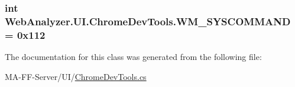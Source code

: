 \subsubsection[{W\+M\+\_\+\+S\+Y\+S\+C\+O\+M\+M\+A\+N\+D}]{\setlength{\rightskip}{0pt plus 5cm}int Web\+Analyzer.\+U\+I.\+Chrome\+Dev\+Tools.\+W\+M\+\_\+\+S\+Y\+S\+C\+O\+M\+M\+A\+N\+D = 0x112\hspace{0.3cm}{\ttfamily [static]}}\label{class_web_analyzer_1_1_u_i_1_1_chrome_dev_tools_a4e5a194cb8f1eb30877f810655d14f6f}


The documentation for this class was generated from the following file\+:\begin{DoxyCompactItemize}
\item 
M\+A-\/\+F\+F-\/\+Server/\+U\+I/\hyperlink{_chrome_dev_tools_8cs}{Chrome\+Dev\+Tools.\+cs}\end{DoxyCompactItemize}
